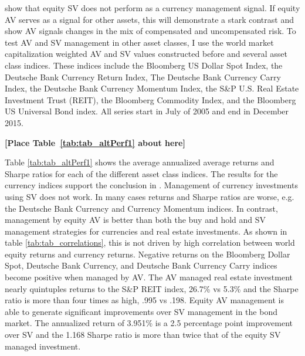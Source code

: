 \citet{moreira_volatility-managed_2017} show that equity SV does not perform as a currency management signal. If equity AV serves as a signal for other assets, this will demonstrate a stark contrast and show AV signals changes in the mix of compensated and uncompensated risk. To test AV and SV management in other asset classes, I use the world market capitalization weighted AV and SV values constructed before and several asset class indices. These indices include the Bloomberg US Dollar Spot Index, the Deutsche Bank Currency Return Index, The Deutsche Bank Currency Carry Index, the Deutsche Bank Currency Momentum Index, the S\&P U.S. Real Estate Investment Trust (REIT), the Bloomberg Commodity Index, and the Bloomberg US Universal Bond index. All series start in July of 2005 and end in December 2015.

\bigskip
\centerline{\bf [Place Table~\ref{tab:tab_altPerf1} about here]}
\bigskip

Table \ref{tab:tab_altPerf1} shows the average annualized average returns and Sharpe ratios for each of the different asset class indices. The results for the currency indices support the conclusion in \citet{moreira_volatility-managed_2017}. Management of currency investments using SV does not work. In many cases returns and Sharpe ratios are worse, e.g. the Deutsche Bank Currency and Currency Momentum indices. In contrast, management by equity AV is better than both the buy and hold and SV management strategies for currencies and real estate investments. As shown in table \ref{tab:tab_correlations}, this is not driven by high correlation between world equity returns and currency returns. Negative returns on the Bloomberg Dollar Spot, Deutsche Bank Currency, and Deutsche Bank Currency Carry indices become positive when managed by AV. The AV managed real estate investment nearly quintuples returns to the S\&P REIT index, 26.7\% vs 5.3\% and the Sharpe ratio is more than four times as high, .995 vs .198. Equity AV management is able to generate significant improvements over SV management in the bond market. The annualized return of 3.951\% is a 2.5 percentage point improvement over SV and the 1.168 Sharpe ratio is more than twice that of the equity SV managed investment.

